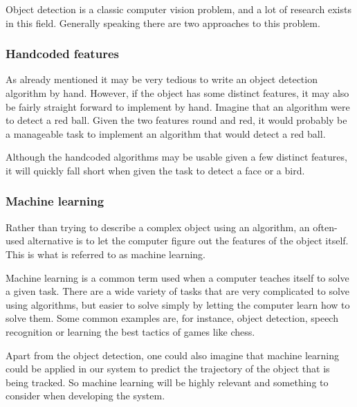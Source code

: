 Object detection is a classic computer vision problem, and a lot of research exists in this field.
Generally speaking there are two approaches to this problem.

\subsubsection{Handcoded features}
As already mentioned it may be very tedious to write an object detection algorithm by hand.
However, if the object has some distinct features, it may also be fairly straight forward to implement by hand.
Imagine that an algorithm were to detect a red ball. 
Given the two features round and red, it would probably be a manageable task to implement an algorithm that would detect a red ball.

Although the handcoded algorithms may be usable given a few distinct features, it will quickly fall short when given the task to detect a face or a bird.

\subsubsection{Machine learning}
Rather than trying to describe a complex object using an algorithm, an often-used alternative is to let the computer figure out the features of the object itself.
This is what is referred to as machine learning.

Machine learning is a common term used when a computer teaches itself to solve a given task\cite{MachineLearningWiki}.
There are a wide variety of tasks that are very complicated to solve using algorithms, but easier to solve simply by letting the computer learn how to solve them. 
Some common examples are, for instance, object detection, speech recognition or learning the best tactics of games like chess.

Apart from the object detection, one could also imagine that machine learning could be applied in our system to predict the trajectory of the object that is being tracked.
So machine learning will be highly relevant and something to consider when developing the system.